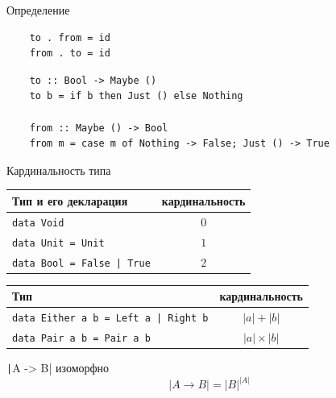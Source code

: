 
    \begin{frame}[fragile]{Определение}
        \pause
        \begin{verbatim}
    to . from = id
    from . to = id
        \end{verbatim}
        \vspace{1em}
        \pause
        \begin{verbatim}
    to :: Bool -> Maybe ()
    to b = if b then Just () else Nothing

    from :: Maybe () -> Bool
    from m = case m of Nothing -> False; Just () -> True
        \end{verbatim}
    \end{frame}

    \begin{frame}[fragile]{Кардинальность типа}
        \pause
        \begin{center}
            \begin{tabular}{|l|c|}
                \hline
                Тип и его декларация                                                                                                                                                                            & кардинальность \\
                \hline
                \texttt{data Void}                                                                                                                                                                 & $0$            \\
                \texttt{data Unit = Unit} & $1$ \\
                \texttt{data Bool = False | True}                                                                                                                                                  & $2$            \\
                \hline
            \end{tabular}
        \end{center}
        \pause
        \begin{center}
            \begin{tabular}{|l|c|}
                \hline
                Тип                                                      & кардинальность   \\
                \hline
                \texttt{data Either a b = Left a | Right b} & $|a| + |b|$      \\
                \texttt{data Pair a b = Pair a b}           & $|a| \times |b|$ \\
                \hline
            \end{tabular}
        \end{center}

        \vspace{1em}
        \pause
        \texttt|A -> B| изоморфно \[|A \to B| = |B|^{|A|}\]
    \end{frame}

